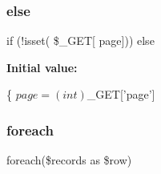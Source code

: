\hypertarget{alerts_8php_a0ac1dc775b5200ca1ce7b5e63b96a90f}{}\label{alerts_8php_a0ac1dc775b5200ca1ce7b5e63b96a90f} 
\subsubsection{\texorpdfstring{else}{else}}
{\footnotesize\ttfamily if (!isset( \$\+\_\+\+G\+ET\mbox{[} \textquotesingle{}page\textquotesingle{}\mbox{]})) else}

{\bfseries Initial value\+:}
\begin{DoxyCode}
\{
    $page = (int) $\_GET[\textcolor{stringliteral}{'page'}]
\end{DoxyCode}
\hypertarget{alerts_8php_a54dfda288ab58a7bf7fb40f0ca668433}{}\label{alerts_8php_a54dfda288ab58a7bf7fb40f0ca668433} 
\subsubsection{\texorpdfstring{foreach}{foreach}}
{\footnotesize\ttfamily foreach(\$records as \$row)}

